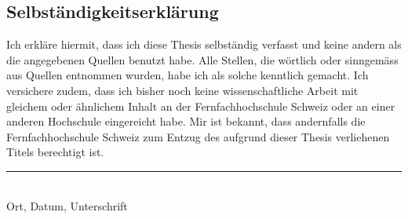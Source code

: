 \begin{appendix}


\chapter*{Selbständigkeitserklärung}

Ich erkläre hiermit, dass ich diese Thesis selbständig verfasst 
und keine andern als die angegebenen Quellen benutzt habe. 
Alle Stellen, die wörtlich oder sinngemäss aus Quellen entnommen wurden, 
habe ich als solche kenntlich gemacht. Ich versichere zudem, dass ich bisher 
noch keine wissenschaftliche Arbeit mit gleichem oder ähnlichem Inhalt an der 
Fernfachhochschule Schweiz oder an einer anderen Hochschule eingereicht habe. 
Mir ist bekannt, dass andernfalls die Fernfachhochschule Schweiz zum Entzug 
des aufgrund dieser Thesis verliehenen Titels berechtigt ist.

\vspace{4cm}
\noindent
\hrule \ \\[-0.5ex]
Ort, Datum, Unterschrift
\end{appendix}

